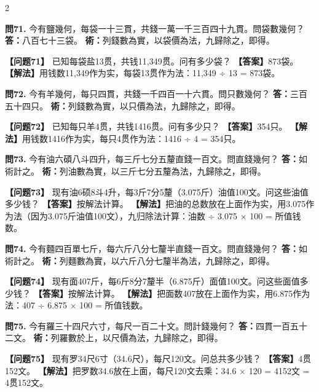 \documentclass[11pt,a4paper]{article}
\begin{document}
\begin{paracol}{2}
\switchcolumn*

\textbf{問71.} 今有鹽幾何，每袋一十三貫，共錢一萬一千三百四十九貫。問袋數幾何？\break
\textbf{答：}八百七十三袋。\break
\textbf{術：}列錢數為實，以袋價為法，九歸除之，即得。

\switchcolumn

\textbf{【问题71】} 已知每袋盐13贯，共钱11,349贯。问有多少袋？\break
\textbf{【答案】}873袋。\break
\textbf{【解法】}用钱数11,349作为实，每袋13贯作为法：11,349 ÷ 13 = 873袋。

\switchcolumn*

\textbf{問72.} 今有羊幾何，每只四貫，共錢一千四百一十六貫。問只數幾何？\break
\textbf{答：}三百五十四只。\break
\textbf{術：}列錢數為實，以只價為法，九歸除之，即得。

\switchcolumn

\textbf{【问题72】} 已知每只羊4贯，共钱1416贯。问有多少只？\break
\textbf{【答案】}354只。\break
\textbf{【解法】}用钱数1416作为实，每只4贯作为法：1416 ÷ 4 = 354只。

\switchcolumn*

\textbf{問73.} 今有油六碩八斗四升，每三斤七分五釐直錢一百文。問直錢幾何？\break
\textbf{答：}如術計之。\break
\textbf{術：}列油數為實，以三斤七分五釐為法，九歸除之，即得。

\switchcolumn

\textbf{【问题73】} 现有油6硕8斗4升，每3斤7分5釐（3.075斤）油值100文。问这些油值多少钱？\break
\textbf{【答案】}按解法计算。\break
\textbf{【解法】}把油的总数放在上面作为实，用3.075作为法（因为3.075斤油值100文），九归除法计算：油数 ÷ 3.075 × 100 = 所值钱数。

\switchcolumn*

\textbf{問74.} 今有麵四百單七斤，每六斤八分七釐半直錢一百文。問直錢幾何？\break
\textbf{答：}如術計之。\break
\textbf{術：}列麵數為實，以六斤八分七釐半為法，九歸除之，即得。

\switchcolumn

\textbf{【问题74】} 现有面407斤，每6斤8分7釐半（6.875斤）面值100文。问这些面值多少钱？\break
\textbf{【答案】}按解法计算。\break
\textbf{【解法】}把面数407放在上面作为实，用6.875作为法：407 ÷ 6.875 × 100 = 所值钱数。

\switchcolumn*

\textbf{問75.} 今有羅三十四尺六寸，每尺一百二十文。問計錢幾何？\break
\textbf{答：}四貫一百五十二文。\break
\textbf{術：}列羅數於上，以尺價為法，九歸除之，即得。

\switchcolumn

\textbf{【问题75】} 现有罗34尺6寸（34.6尺），每尺120文。问总共多少钱？\break
\textbf{【答案】}4贯152文。\break
\textbf{【解法】}把罗数34.6放在上面，每尺120文去乘：34.6 × 120 = 4152文 = 4贯152文。


\end{paracol}
\end{document}
